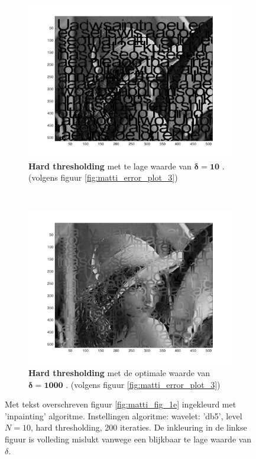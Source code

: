\begin{figure}
    \centering
    \begin{subfigure}[b]{0.45\textwidth}
        \includegraphics[width=\textwidth]{../src/inpainting/lena_failed_4}
        \caption{ \textbf{Hard thresholding} met te lage waarde van $\mathbf{\delta = 10 }$ . (volgens figuur \ref{fig:matti_error_plot_3})}
        \label{fig:matti_failed_4}
    \end{subfigure}
    ~ %
    \begin{subfigure}[b]{0.45\textwidth}
        \includegraphics[width=\textwidth]{../src/inpainting/lena_optimal_4}
        \caption{\textbf{Hard thresholding} met de optimale waarde van $\mathbf{\delta = 1000 }$ . (volgens figuur \ref{fig:matti_error_plot_3})}
        \label{fig:matti_optimal_4}
    \end{subfigure}
    \caption{Met tekst overschreven figuur \ref{fig:matti_fig_1e} ingekleurd met 'inpainting' algoritme. Instellingen algoritme: wavelet: 'db5', level $N = 10$, hard thresholding, 200 iteraties. De inkleuring in de linkse figuur is volleding mislukt vanwege een blijkbaar te lage waarde van $\delta$.} \label{fig:matti_hard_4}
\end{figure}

